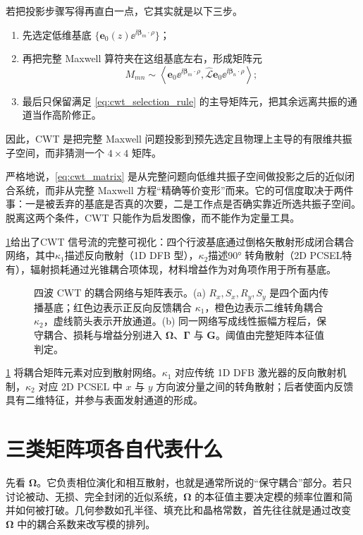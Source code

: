 若把投影步骤写得再直白一点，它其实就是以下三步。
\begin{enumerate}
  \item 先选定低维基底 $\{\bm e_0(z)\ee^{\ii\bm\beta_m\cdot\rho}\}$；
  \item 再把完整 Maxwell 算符夹在这组基底左右，形成矩阵元
  \[
  M_{mn}\sim
  \left\langle
  \bm e_0\ee^{\ii\bm\beta_m\cdot\rho},
  \hat{\mathcal L}
  \bm e_0\ee^{\ii\bm\beta_n\cdot\rho}
  \right\rangle;
  \]
  \item 最后只保留满足 \cref{eq:cwt_selection_rule} 的主导矩阵元，把其余远离共振的通道当作高阶修正。
\end{enumerate}
因此，CWT 是把完整 Maxwell 问题投影到预先选定且物理上主导的有限维共振子空间，而非猜测一个 $4\times4$ 矩阵。

\begin{RigorousBox}
严格地说，\cref{eq:cwt_matrix} 是从完整问题向低维共振子空间做投影之后的近似闭合系统，而非从完整 Maxwell 方程“精确等价变形”而来。它的可信度取决于两件事：一是被丢弃的基底是否真的次要，二是工作点是否确实靠近所选共振子空间。脱离这两个条件，CWT 只能作为启发图像，而不能作为定量工具。
\end{RigorousBox}

\cref{fig:ch09_cwt_signal_flow}给出了CWT 信号流的完整可视化：四个行波基底通过倒格矢散射形成闭合耦合网络，其中$\kappa_1$描述反向散射（1D DFB 型），$\kappa_2$描述90° 转角散射（2D PCSEL特有），辐射损耗通过光锥耦合项体现，材料增益作为对角项作用于所有基底。

\begin{figure}[htbp]
  \centering
  
  \caption{四波 CWT 的耦合网络与矩阵表示。(a) $R_x,S_x,R_y,S_y$ 是四个面内传播基底；红色边表示正反向反馈耦合 $\kappa_1$，橙色边表示二维转角耦合 $\kappa_2$，虚线箭头表示开放通道。(b) 同一网络写成线性振幅方程后，保守耦合、损耗与增益分别进入 $\bm\Omega$、$\bm\Gamma$ 与 $\bm G$。阈值由完整矩阵本征值判定。}
  \label{fig:ch09_cwt_signal_flow}
\end{figure}

\cref{fig:ch09_cwt_signal_flow} 将耦合矩阵元素对应到散射网络。$\kappa_1$ 对应传统 1D DFB 激光器的反向散射机制，$\kappa_2$ 对应 2D PCSEL 中 $x$ 与 $y$ 方向波分量之间的转角散射；后者使面内反馈具有二维特征，并参与表面发射通道的形成。

\section{三类矩阵项各自代表什么}
先看 $\bm{\Omega}$。它负责相位演化和相互散射，也就是通常所说的“保守耦合”部分。若只讨论被动、无损、完全封闭的近似系统，$\bm{\Omega}$ 的本征值主要决定模的频率位置和简并如何被打破。几何参数如孔半径、填充比和晶格常数，首先往往就是通过改变 $\bm{\Omega}$ 中的耦合系数来改写模的排列。

